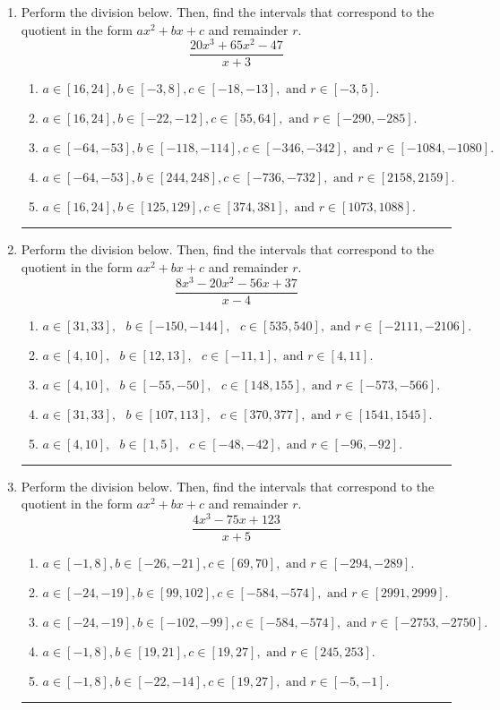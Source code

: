 \documentclass[14pt]{extbook}
\newcommand{\litem}[1]{\item#1\hspace*{-1cm}\rule{\textwidth}{0.4pt}}
\begin{document}
\begin{enumerate}
{\begin{enumerate}[label=\Alph*.]
\end{enumerate} }
\litem{
Perform the division below. Then, find the intervals that correspond to the quotient in the form $ax^2+bx+c$ and remainder $r$.\[ \frac{20x^{3} +65 x^{2} -47}{x + 3} \]\begin{enumerate}[label=\Alph*.]
\item \( a \in [16, 24], b \in [-3, 8], c \in [-18, -13], \text{ and } r \in [-3, 5]. \)
\item \( a \in [16, 24], b \in [-22, -12], c \in [55, 64], \text{ and } r \in [-290, -285]. \)
\item \( a \in [-64, -53], b \in [-118, -114], c \in [-346, -342], \text{ and } r \in [-1084, -1080]. \)
\item \( a \in [-64, -53], b \in [244, 248], c \in [-736, -732], \text{ and } r \in [2158, 2159]. \)
\item \( a \in [16, 24], b \in [125, 129], c \in [374, 381], \text{ and } r \in [1073, 1088]. \)

\end{enumerate} }
\litem{
Perform the division below. Then, find the intervals that correspond to the quotient in the form $ax^2+bx+c$ and remainder $r$.\[ \frac{8x^{3} -20 x^{2} -56 x + 37}{x -4} \]\begin{enumerate}[label=\Alph*.]
\item \( a \in [31, 33], \text{   } b \in [-150, -144], \text{   } c \in [535, 540], \text{   and   } r \in [-2111, -2106]. \)
\item \( a \in [4, 10], \text{   } b \in [12, 13], \text{   } c \in [-11, 1], \text{   and   } r \in [4, 11]. \)
\item \( a \in [4, 10], \text{   } b \in [-55, -50], \text{   } c \in [148, 155], \text{   and   } r \in [-573, -566]. \)
\item \( a \in [31, 33], \text{   } b \in [107, 113], \text{   } c \in [370, 377], \text{   and   } r \in [1541, 1545]. \)
\item \( a \in [4, 10], \text{   } b \in [1, 5], \text{   } c \in [-48, -42], \text{   and   } r \in [-96, -92]. \)

\end{enumerate} }
\litem{
Perform the division below. Then, find the intervals that correspond to the quotient in the form $ax^2+bx+c$ and remainder $r$.\[ \frac{4x^{3} -75 x + 123}{x + 5} \]\begin{enumerate}[label=\Alph*.]
\item \( a \in [-1, 8], b \in [-26, -21], c \in [69, 70], \text{ and } r \in [-294, -289]. \)
\item \( a \in [-24, -19], b \in [99, 102], c \in [-584, -574], \text{ and } r \in [2991, 2999]. \)
\item \( a \in [-24, -19], b \in [-102, -99], c \in [-584, -574], \text{ and } r \in [-2753, -2750]. \)
\item \( a \in [-1, 8], b \in [19, 21], c \in [19, 27], \text{ and } r \in [245, 253]. \)
\item \( a \in [-1, 8], b \in [-22, -14], c \in [19, 27], \text{ and } r \in [-5, -1]. \)


\end{enumerate}}
\end{enumerate}
\end{document}
